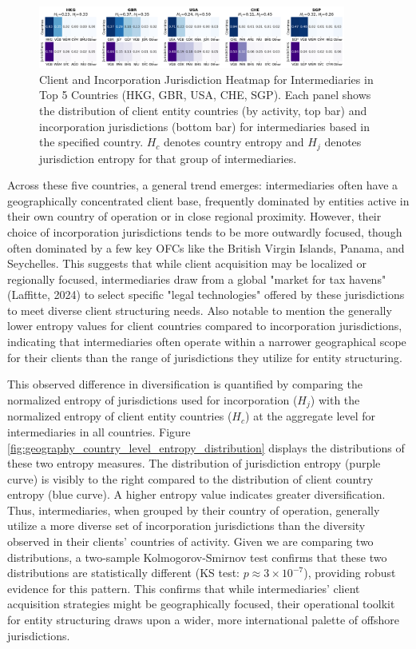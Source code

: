 \begin{figure}[htbp]
    \centering
    \includegraphics[width=0.9\textwidth]{images/Geography_Country_Heatmaps_Top5.png}
    \caption{Client and Incorporation Jurisdiction Heatmap for Intermediaries in Top 5 Countries (HKG, GBR, USA, CHE, SGP). Each panel shows the distribution of client entity countries (by activity, top bar) and incorporation jurisdictions (bottom bar) for intermediaries based in the specified country. $H_c$ denotes country entropy and $H_j$ denotes jurisdiction entropy for that group of intermediaries.}
    \label{fig:geography_country_heatmaps_top5}
\end{figure}

Across these five countries, a general trend emerges: intermediaries often have a geographically concentrated client base, frequently dominated by entities active in their own country of operation or in close regional proximity. However, their choice of incorporation jurisdictions tends to be more outwardly focused, though often dominated by a few key OFCs like the British Virgin Islands, Panama, and Seychelles. This suggests that while client acquisition may be localized or regionally focused, intermediaries draw from a global "market for tax havens" (Laffitte, 2024) to select specific "legal technologies" offered by these jurisdictions to meet diverse client structuring needs. Also notable to mention the generally lower entropy values for client countries compared to incorporation jurisdictions, indicating that intermediaries often operate within a narrower geographical scope for their clients than the range of jurisdictions they utilize for entity structuring. 

This observed difference in diversification is quantified by comparing the normalized entropy of jurisdictions used for incorporation ($H_j$) with the normalized entropy of client entity countries ($H_c$) at the aggregate level for intermediaries in all countries. Figure \ref{fig:geography_country_level_entropy_distribution} displays the distributions of these two entropy measures. The distribution of jurisdiction entropy (purple curve) is visibly to the right compared to the distribution of client country entropy (blue curve). A higher entropy value indicates greater diversification. Thus, intermediaries, when grouped by their country of operation, generally utilize a more diverse set of incorporation jurisdictions than the diversity observed in their clients' countries of activity. Given we are comparing two distributions, a two-sample Kolmogorov-Smirnov test confirms that these two distributions are statistically different (KS test: $p \approx 3 \times 10^{-7}$), providing robust evidence for this pattern. This confirms that while intermediaries' client acquisition strategies might be geographically focused, their operational toolkit for entity structuring draws upon a wider, more international palette of offshore jurisdictions.

